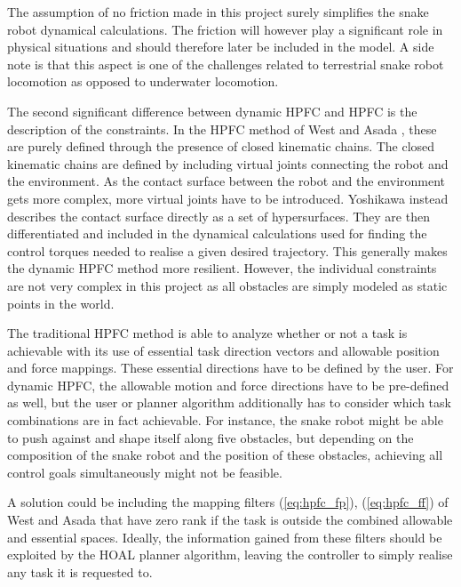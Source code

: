 The assumption of no friction made in this project surely simplifies the snake robot dynamical calculations. The friction will however play a significant role in physical situations and should therefore later be included in the model. A side note is that this aspect is one of the challenges related to terrestrial snake robot locomotion as opposed to underwater locomotion.

The second significant difference between dynamic HPFC and HPFC is the description of the constraints. In the HPFC method of West and Asada \cite{west1985method}, these are purely defined through the presence of closed kinematic chains. The closed kinematic chains are defined by including virtual joints connecting the robot and the environment. As the contact surface between the robot and the environment gets more complex, more virtual joints have to be introduced. Yoshikawa \cite{yoshikawa1987dynamic} instead describes the contact surface directly as a set of hypersurfaces. They are then differentiated and included in the dynamical calculations used for finding the control torques needed to realise a given desired trajectory. This generally makes the dynamic HPFC method more resilient. However, the individual constraints are not very complex in this project as all obstacles are simply modeled as static points in the world.

The traditional HPFC method is able to analyze whether or not a task is achievable with its use of essential task direction vectors and allowable position and force mappings. These essential directions have to be defined by the user. For dynamic HPFC, the allowable motion and force directions have to be pre-defined as well, but the user or planner algorithm additionally has to consider which task combinations are in fact achievable. For instance, the snake robot might be able to push against and shape itself along five obstacles, but depending on the composition of the snake robot and the position of these obstacles, achieving all control goals simultaneously might not be feasible. 

A solution could be including the mapping filters (\ref{eq:hpfc_fp}), (\ref{eq:hpfc_ff}) of West and Asada \cite{west1985method} that have zero rank if the task is outside the combined allowable and essential spaces. Ideally, the information gained from these filters should be exploited by the HOAL planner algorithm, leaving the controller to simply realise any task it is requested to.

